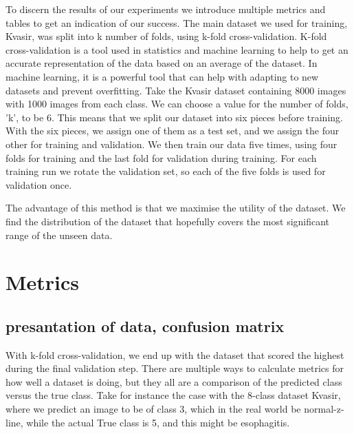 To discern the results of our experiments we introduce multiple metrics and tables to get an indication of our success. 
The main dataset we used for training, Kvasir, was split into k number of folds, using k-fold cross-validation. 
K-fold cross-validation is a tool used in statistics and machine learning to help to get an accurate representation of the data based on an average of the dataset.  In machine learning, it is a powerful tool that can help with adapting to new datasets and prevent overfitting. 
Take the Kvasir dataset containing 8000 images with 1000 images from each class. We can choose a value for the number of folds, 'k', to be 6. This means that we split our dataset into six pieces before training.  With the six pieces, we assign one of them as a test set, and we assign the four other for training and validation. We then train our data five times, using four folds for training and the last fold for validation during training. For each training run we rotate the validation set, so each of the five folds is used for validation once. 

The advantage of this method is that we maximise the utility of the dataset. We find the distribution of the dataset that hopefully covers the most significant range of the unseen data. 
\section{Metrics}
\subsection{presantation of data, confusion matrix}
With k-fold cross-validation, we end up with the dataset that scored the highest during the final validation step.  There are multiple ways to calculate metrics for how well a dataset is doing,  but they all are a comparison of the predicted class versus the true class.  
Take for instance the case with the 8-class dataset Kvasir, where we predict an image to be of class 3, which in the real world be normal-z-line, while the actual True class is 5, and this might be esophagitis.

